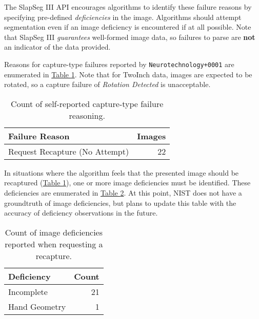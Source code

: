 \documentclass[]{article}
\begin{document}
The SlapSeg III API encourages algorithms to identify these failure
reasons by specifying pre-defined \emph{deficiencies} in the image.
Algorithms should attempt segmentation even if an image deficiency is
encountered if at all possible. Note that SlapSeg III \emph{guarantees}
well-formed image data, so failures to parse are \textbf{not} an
indicator of the data provided.

Reasons for capture-type failures reported by
\texttt{Neurotechnology+0001} are enumerated in
\protect\hyperlink{tab:tab-twoinch-api-failures}{Table
\ref{tab:tab-twoinch-api-failures}}. Note that for TwoInch data, images
are expected to be rotated, so a capture failure of \emph{Rotation
Detected} is unacceptable.

\begin{table}[!h]

\caption{\label{tab:tab-twoinch-api-failures}Count of self-reported capture-type failure reasoning.}
\centering
\begin{tabular}{lr}
\toprule
Failure Reason & Images\\
\midrule
\rowcolor{gray!6}  Request Recapture (No Attempt) & 22\\
\bottomrule
\end{tabular}
\end{table}

In situations where the algorithm feels that the presented image should
be recaptured (\protect\hyperlink{tab:tab-twoinch-api-failures}{Table
\ref{tab:tab-twoinch-api-failures}}), one or more image deficiencies
must be identified. These deficiencies are enumerated in
\protect\hyperlink{tab:tab-twoinch-deficiencies}{Table
\ref{tab:tab-twoinch-deficiencies}}. At this point, NIST does not have a
groundtruth of image deficiencies, but plans to update this table with
the accuracy of deficiency observations in the future.

\begin{table}[!h]

\caption{\label{tab:tab-twoinch-deficiencies}Count of image deficiencies reported when requesting a recapture.}
\centering
\begin{tabular}{lr}
\toprule
Deficiency & Count\\
\midrule
\rowcolor{gray!6}  Incomplete & 21\\
Hand Geometry & 1\\
\bottomrule
\end{tabular}
\end{table}
\end{document}
